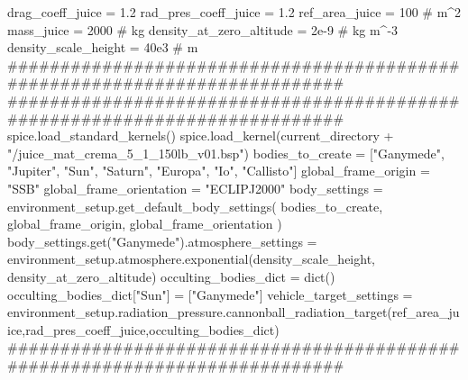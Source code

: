 {}
\markdownRendererSectionEnd \markdownRendererSectionBegin
{}\markdownRendererInterblockSeparator
{}
\markdownRendererSectionEnd \markdownRendererSectionBegin
{}\markdownRendererInterblockSeparator
{}
\markdownRendererSectionEnd \markdownRendererSectionBegin
{}\markdownRendererInterblockSeparator
{}drag_coeff_juice = 1.2 rad_pres_coeff_juice = 1.2 ref_area_juice = 100 # m^2 mass_juice = 2000 # kg\markdownRendererInterblockSeparator
{}
\markdownRendererSectionEnd \markdownRendererSectionBegin
{}\markdownRendererInterblockSeparator
{}density_at_zero_altitude = 2e-9 # kg m^-3 density_scale_height = 40e3 # m\markdownRendererInterblockSeparator
{}###########################################################################\markdownRendererInterblockSeparator
{}
\markdownRendererSectionEnd \markdownRendererSectionBegin
{}\markdownRendererInterblockSeparator
{}###########################################################################\markdownRendererInterblockSeparator
{}
\markdownRendererSectionEnd \markdownRendererSectionBegin
{}\markdownRendererInterblockSeparator
{}spice.load_standard_kernels() spice.load_kernel(current_directory + "/juice_mat_crema_5_1_150lb_v01.bsp")\markdownRendererInterblockSeparator
{}
\markdownRendererSectionEnd \markdownRendererSectionBegin
{}\markdownRendererInterblockSeparator
{}bodies_to_create = ["Ganymede", "Jupiter", "Sun", "Saturn", "Europa", "Io", "Callisto"] global_frame_origin = "SSB" global_frame_orientation = "ECLIPJ2000" body_settings = environment_setup.get_default_body_settings( bodies_to_create, global_frame_origin, global_frame_orientation ) body_settings.get("Ganymede").atmosphere_settings = environment_setup.atmosphere.exponential(density_scale_height, density_at_zero_altitude) occulting_bodies_dict = dict() occulting_bodies_dict["Sun"] = ["Ganymede"] vehicle_target_settings = environment_setup.radiation_pressure.cannonball_radiation_target(ref_area_juice,rad_pres_coeff_juice,occulting_bodies_dict)\markdownRendererInterblockSeparator
{}###########################################################################\markdownRendererInterblockSeparator
{}
\markdownRendererSectionEnd \markdownRendererSectionBegin
